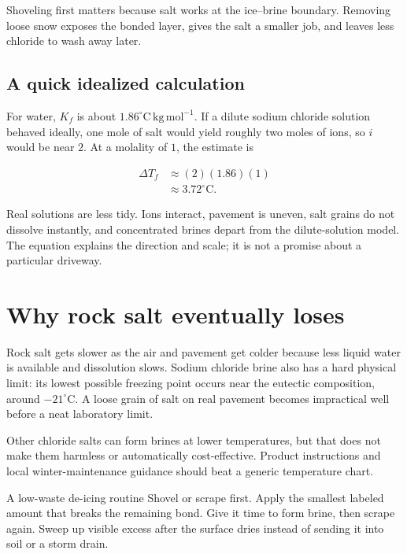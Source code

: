 \documentclass[11pt]{article}
\begin{document}
Shoveling first matters because salt works at the ice--brine boundary. Removing loose snow exposes the bonded layer, gives the salt a smaller job, and leaves less chloride to wash away later.

\subsection{A quick idealized calculation}

For water, \(K_f\) is about \(1.86^\circ\mathrm{C}\,\mathrm{kg}\,\mathrm{mol}^{-1}\). If a dilute sodium chloride solution behaved ideally, one mole of salt would yield roughly two moles of ions, so \(i\) would be near \(2\). At a molality of \(1\), the estimate is

\begin{align}
\Delta T_f &\approx (2)(1.86)(1) \\
            &\approx 3.72^\circ\mathrm{C}.
\end{align}

Real solutions are less tidy. Ions interact, pavement is uneven, salt grains do not dissolve instantly, and concentrated brines depart from the dilute-solution model. The equation explains the direction and scale; it is not a promise about a particular driveway.

\section{Why rock salt eventually loses}

Rock salt gets slower as the air and pavement get colder because less liquid water is available and dissolution slows. Sodium chloride brine also has a hard physical limit: its lowest possible freezing point occurs near the eutectic composition, around \(-21^\circ\mathrm{C}\). A loose grain of salt on real pavement becomes impractical well before a neat laboratory limit.

Other chloride salts can form brines at lower temperatures, but that does not make them harmless or automatically cost-effective. Product instructions and local winter-maintenance guidance should beat a generic temperature chart.

\begin{biscuitbox}{A low-waste de-icing routine}
Shovel or scrape first. Apply the smallest labeled amount that breaks the remaining bond. Give it time to form brine, then scrape again. Sweep up visible excess after the surface dries instead of sending it into soil or a storm drain.
\end{biscuitbox}
\end{document}
